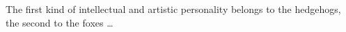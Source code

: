 \documentclass[a4paper,twoside]{ociamthesis}
\newcommand*{\bibtitle}{References}
\begin{document}
\flushbottom




\startappendices




\begin{savequote}[8cm]
The first kind of intellectual and artistic personality belongs to the hedgehogs, the second to the foxes \dots
\end{savequote}

\setlength{\baselineskip}{0pt} %

{\renewcommand*\MakeUppercase[1]{#1}%
\printbibliography[heading=bibintoc,title={\bibtitle}]}
\end{document}
